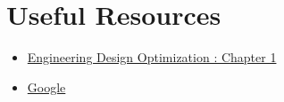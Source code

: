 \documentclass[12pt]{article}
\begin{document}

\section{Useful Resources}
\begin{itemize}
   		\item \href{http://flowlab.groups.et.byu.net/mdobook.pdf}{Engineering Design Optimization : Chapter 1}
   		\item \href{https://www.google.com/}{Google}
\end{itemize}	
	
	
\end{document}
